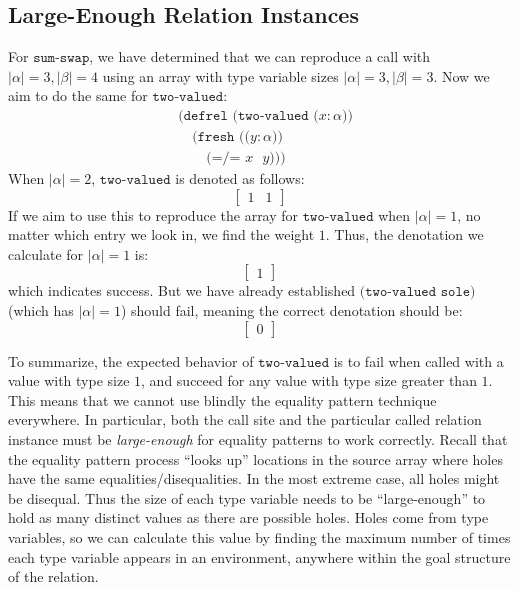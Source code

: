 \documentclass{report}
\theoremstyle{definition}
\begin{document}
\subsection{Large-Enough Relation Instances}

For \(\texttt{sum-swap}\), we have determined that we can reproduce a call with \(|\alpha| = 3, |\beta| = 4\) using an array with type variable sizes \(|\alpha| = 3, |\beta| = 3\).
Now we aim to do the same for \(\texttt{two-valued}\):
\begin{equation}
\begin{aligned}
	& \texttt{(defrel (two-valued (\(x : \alpha\)))} \\
	& \quad \texttt{(fresh ((\(y : \alpha\)))} \\
	& \quad \quad \texttt{(=/= \(x\) \(y\))))}
\end{aligned}
\end{equation}
When \(|\alpha| = 2\), \(\texttt{two-valued}\) is denoted as follows:
\begin{equation}
	\begin{bmatrix} 1 & 1 \end{bmatrix} 
\end{equation}
If we aim to use this to reproduce the array for \(\texttt{two-valued}\) when \(|\alpha| = 1\), no matter which entry we look in, we find the weight \(1\).
Thus, the denotation we calculate for \(|\alpha| = 1\) is:
\begin{equation}
	\begin{bmatrix} 1 \end{bmatrix} 
\end{equation}
which indicates success.
But we have already established \(\texttt{(two-valued sole)}\) (which has \(|\alpha| = 1\)) should fail, meaning the correct denotation should be:
\begin{equation}
	\begin{bmatrix} 0 \end{bmatrix} 
\end{equation}

To summarize, the expected behavior of \(\texttt{two-valued}\) is to fail when called with a value with type size \(1\), and succeed for any value with type size greater than \(1\).
This means that we cannot use blindly the equality pattern technique everywhere.
In particular, both the call site and the particular called relation instance must be \emph{large-enough} for equality patterns to work correctly.
Recall that the equality pattern process ``looks up'' locations in the source array where holes have the same equalities/disequalities.
In the most extreme case, all holes might be disequal.
Thus the size of each type variable needs to be ``large-enough'' to hold as many distinct values as there are possible holes.
Holes come from type variables, so we can calculate this value by finding the maximum number of times each type variable appears in an environment,
anywhere within the goal structure of the relation.
\end{document}
